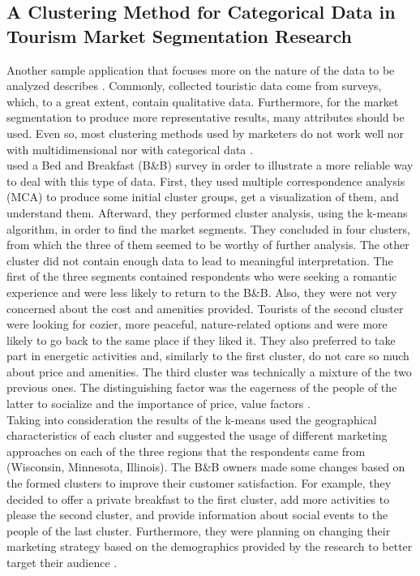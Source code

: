 \subsection{A Clustering Method for Categorical Data in Tourism Market Segmentation Research}
Another sample application that focuses more on the nature of the data to be analyzed describes \textcite{categorical}. Commonly, collected touristic data come from surveys, which, to a great extent, contain qualitative data. Furthermore, for the market segmentation to produce more representative results, many attributes should be used. Even so, most clustering methods used by marketers do not work well nor with multidimensional nor with categorical data \autocite[391]{categorical}. \\
\textcite{categorical} used a Bed and Breakfast (B\&B) survey in order to illustrate a more reliable way to deal with this type of data. First, they used multiple correspondence analysis (MCA) to produce some initial cluster groups, get a visualization of them, and understand them. Afterward, they performed cluster analysis, using the k-means algorithm, in order to find the market segments. They concluded in four clusters, from which the three of them seemed to be worthy of further analysis. The other cluster did not contain enough data to lead to meaningful interpretation. The first of the three segments contained respondents who were seeking a romantic experience and were less likely to return to the B\&B. Also, they were not very concerned about the cost and amenities provided. Tourists of the second cluster were looking for cozier, more peaceful, nature-related options and were more likely to go back to the same place if they liked it. They also preferred to take part in energetic activities and, similarly to the first cluster, do not care so much about price and amenities. The third cluster was technically a mixture of the two previous ones. The distinguishing factor was the eagerness of the people of the latter to socialize and the importance of price, value factors \autocite[394-395]{categorical}. \\
Taking into consideration the results of the k-means \textcite{categorical} used the geographical characteristics of each cluster and suggested the usage of different marketing approaches on each of the three regions that the respondents came from (Wisconsin, Minnesota, Illinois). The B\&B owners made some changes based on the formed clusters to improve their customer satisfaction. For example, they decided to offer a private breakfast to the first cluster, add more activities to please the second cluster, and provide information about social events to the people of the last cluster. Furthermore, they were planning on changing their marketing strategy based on the demographics provided by the research to better target their audience \autocite[395-396]{categorical}.